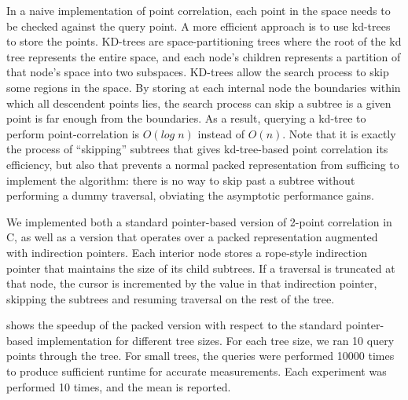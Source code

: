 

In a naive implementation of point correlation, each point in the space needs
to be checked against the query point.
A more efficient approach is to use kd-trees~\cite{bentley75} to store the
points. KD-trees are space-partitioning trees where the root of the kd tree represents the entire space, and each node's children represents a partition of that node's space into two subspaces.
KD-trees allow the search
process to skip some regions in the space. By storing at each internal node
the boundaries within which all descendent points lies, the search process can
skip a subtree is a given point is far enough from the boundaries. As a
result, querying a kd-tree to perform point-correlation is $O(log\; n)$ instead
of $O(n)$. Note that it is exactly the process of ``skipping'' subtrees that
gives kd-tree-based point correlation its efficiency, but also that prevents a
normal packed representation from sufficing to implement the algorithm: there
is no way to skip past a subtree without performing a dummy traversal,
obviating the asymptotic performance gains.

We implemented both a standard pointer-based version of 2-point correlation in
C, as well as a version that operates over a packed representation augmented
with indirection pointers. Each interior node stores a rope-style
indirection pointer that maintains the size of its child subtrees. If a
traversal is truncated at that node, the cursor is incremented by the value in
that indirection pointer, skipping the subtrees and resuming traversal on the
rest of the tree.

 shows the speedup of the packed version
with respect to the standard pointer-based implementation for
different tree sizes. For each tree size, we ran 10 query points
through the tree. For small trees, the queries were performed 10000
times to produce sufficient runtime for accurate measurements. Each
experiment was performed 10 times, and the mean is reported.

